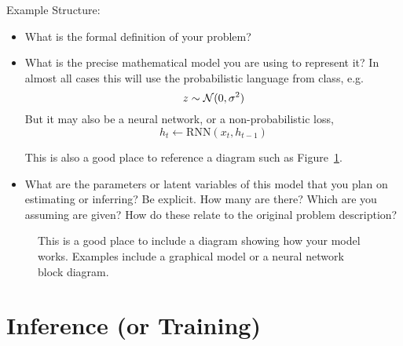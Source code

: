 \documentclass{article}
\begin{document}
Example Structure:

\begin{itemize}
\item What is the formal definition of your problem?
\item What is the precise mathematical model you are using to represent it? In almost all cases this will use the probabilistic language from class, e.g.
  \begin{equation}
  z \sim {\cal N}(0, \sigma^2)\label{eq:1}
\end{equation}
But it may also be a neural network, or a non-probabilistic loss,
\[ h_t \gets \mathrm{RNN}(x_{t}, h_{t-1} )\]

This is also a good place to reference a diagram such as Figure~\ref{fig:diagram}.

\item What are the parameters or latent variables of this model that you plan on estimating or inferring? Be explicit. How many are there? Which are you assuming are given? How do these relate to the original problem description?
\end{itemize}



\begin{figure}
  \centering
  \missingfigure[figheight=8cm]{}
  \caption{\label{fig:diagram} This is a good place to include a diagram showing how your model works. Examples include a graphical model or a neural network block diagram.}
\end{figure}


\section{Inference (or Training)}

\begin{comment}
\begin{itemize}
\item How do you plan on training your parameters / inferring the
  states of your latent variables (MLE / MAP / Backprop / VI / EM / BP / ...)

\item What are the assumptions implicit in this technique? Is it an approximation or exact? If it is an approximation what bound does it optimize?

\item What is the explicit method / algorithm that you derive for learning these parameters?
\end{itemize}
\end{comment}
\end{document}
